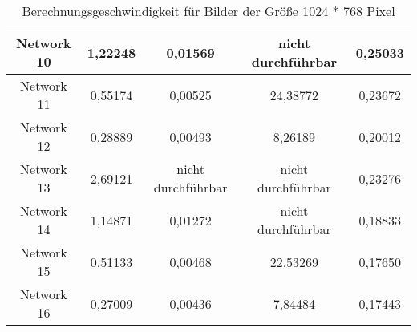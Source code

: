 \begin{table}[H]
\begin{tabular}{ |c|c|c|c|c| }
        Network 10 & 1,22248                                & 0,01569                                & \textcolor{danger}{nicht durchführbar} & 0,25033                                \\ \hline
        Network 11 & 0,55174                                & 0,00525                                & 24,38772                               & 0,23672                                \\ \hline
        Network 12 & 0,28889                                & 0,00493                                & 8,26189                                & 0,20012                                \\ \hline
        Network 13 & 2,69121                                & \textcolor{danger}{nicht durchführbar} & \textcolor{danger}{nicht durchführbar} & 0,23276                                \\ \hline
        Network 14 & 1,14871                                & 0,01272                                & \textcolor{danger}{nicht durchführbar} & 0,18833                                \\ \hline
        Network 15 & 0,51133                                & 0,00468                                & 22,53269                               & 0,17650                                \\ \hline
        Network 16 & 0,27009                                & 0,00436                                & 7,84484                                & 0,17443                                \\ \hline
    \end{tabular}
    \caption{Berechnungsgeschwindigkeit für Bilder der Größe 1024 * 768 Pixel}
    \label{tab:1024x768}
\end{table}


